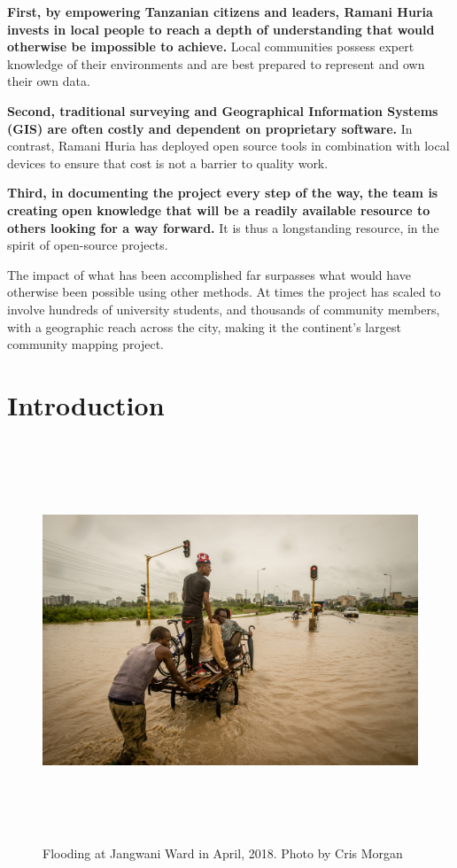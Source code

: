 \documentclass[a4paper,12pt,twoside]{article}
\begin{document}
\begin{multicols}{2}
\textbf{First, by empowering Tanzanian citizens and leaders, Ramani Huria invests in local people to reach a depth of understanding that would otherwise be impossible to achieve.} Local communities possess expert knowledge of their environments and are best prepared to represent and own their own data. 

\textbf{Second, traditional surveying and Geographical Information Systems (GIS) are often costly and dependent on proprietary software.} In contrast, Ramani Huria has deployed open source tools in combination with local devices to ensure that cost is not a barrier to quality work.  

\textbf{Third, in documenting the project every step of the way, the team is creating open knowledge that will be a readily available resource to others looking for a way forward.} It is thus a longstanding resource, in the spirit of open-source projects. 

The impact of what has been accomplished far surpasses what would have otherwise been possible using other methods. At times the project has scaled to involve hundreds of university students, and thousands of community members, with a geographic reach across the city, making it the continent's largest community mapping project.
\end{multicols}

\newpage
\section{Introduction}

\begin{figure}[h!]
	\centering
	\includegraphics[width=\textwidth, height=12cm]{images/Flooding_Jangwani_April_2018_Chris_Morgan.JPG}
	\caption{Flooding at Jangwani Ward in April, 2018. Photo by Cris Morgan}
\end{figure} 
\end{document}
